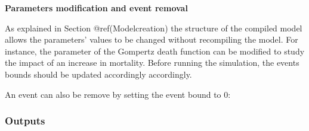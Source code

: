 \textbf{Parameters modification and event removal}

As explained in Section @ref(Modelcreation) the structure of the compiled model allows the parameters' values to be changed without recompiling the model. For instance, the parameter of the Gompertz death function can be modified to study the impact of an increase in mortality.
Before running the simulation, the events bounds should be updated accordingly accordingly.

\begin{Shaded}
\begin{Highlighting}[]
\SpecialCharTok{$}\OtherTok{\textless{}{-}} \NormalTok{(}\NormalTok{,}\NormalTok{) }

\NormalTok{events\_bounds[}\NormalTok{] }\OtherTok{\textless{}{-}} \SpecialCharTok{*}\NormalTok{(}\SpecialCharTok{*}

\OtherTok{\textless{}{-}} 
 \NormalTok{) }
\end{Highlighting}
\end{Shaded}

An event can also be remove by setting the event bound to 0:

\begin{Shaded}
\begin{Highlighting}[]
\OtherTok{\textless{}{-}} 
     \NormalTok{(} \OtherTok{=} \NormalTok{, } \OtherTok{=} \SpecialCharTok{*}\NormalTok{(}\SpecialCharTok{*}
 \NormalTok{)}
\end{Highlighting}
\end{Shaded}

\hypertarget{outputs}{%
\subsubsection{Outputs}\label{outputs}}

